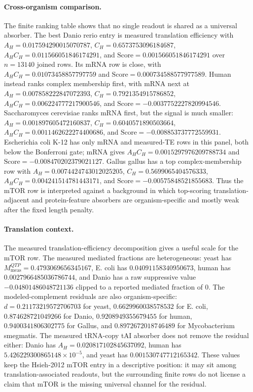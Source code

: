 \paragraph{Cross-organism comparison.}
The finite ranking table shows that no single readout is shared as a universal absorber.  The best Danio rerio entry is measured translation efficiency with $A_H=0.017594290015070787$, $C_H=0.6573753096184687$, $A_HC_H=0.011566051846174291$, and $\mathrm{Score}=0.001566051846174291$ over $n=13140$ joined rows.  Its mRNA row is close, with $A_HC_H=0.01073458857797759$ and $\mathrm{Score}=0.000734588577977589$.  Human instead ranks complex membership first, with mRNA next at $A_H=0.007858222847072393$, $C_H=0.7921354915786852$, $A_HC_H=0.006224777217900546$, and $\mathrm{Score}=-0.0037752227820994546$.  Saccharomyces cerevisiae ranks mRNA first, but the signal is much smaller: $A_H=0.001897605472160837$, $C_H=0.6040571890503664$, $A_HC_H=0.0011462622274400686$, and $\mathrm{Score}=-0.008853737772559931$.  Escherichia coli K-12 has only mRNA and measured-TE rows in this panel, both below the Bonferroni gate; mRNA gives $A_HC_H=0.0015297976209788734$ and $\mathrm{Score}=-0.008470202379021127$.  Gallus gallus has a top complex-membership row with $A_H=0.0074424743012025205$, $C_H=0.5699065404576333$, $A_HC_H=0.004241514781443171$, and $\mathrm{Score}=-0.00575848521855683$.  Thus the mTOR row is interpreted against a background in which top-scoring translation-adjacent and protein-feature absorbers are organism-specific and mostly weak after the fixed length penalty.

\paragraph{Translation context.}
The measured translation-efficiency decomposition gives a useful scale for the mTOR row.  The measured mediated fractions are heterogeneous: yeast has $M^{QTP}_{\mathrm{meas}}=0.4793069656345167$, E. coli has $0.04091158340950673$, human has $0.0027966485036786744$, and Danio has a raw suppressive value $-0.04801486048721136$ clipped to a reported mediated fraction of $0$.  The modeled-complement residuals are also organism-specific: $d=0.21173219572706703$ for yeast, $0.6629960038578532$ for E. coli, $0.874628721049266$ for Danio, $0.9208949355679455$ for human, $0.9400341806302775$ for Gallus, and $0.8972672018746489$ for Mycobacterium smegmatis.  The measured tRNA-copy tAI absorber does not remove the residual either: Danio has $A_H=0.020817102845637092$, human has $5.426229300865148\times 10^{-5}$, and yeast has $0.001530747712165342$.  These values keep the Hsieh-2012 mTOR entry in a descriptive position: it may sit among translation-associated readouts, but the surrounding finite rows do not license a claim that mTOR is the missing universal channel for the residual.

